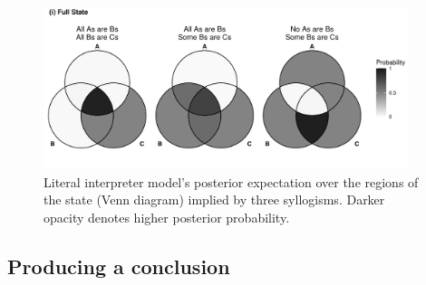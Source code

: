 \documentclass[floatsintext, doc]{apa6}
\begin{document}
%    


\begin{figure}[b]
    \centering
        \includegraphics[width = 0.95\textwidth]{figs/venn_literal_AA1_AI1_EI1_exp.pdf}
    \caption{ Literal interpreter model's posterior expectation over the regions of the state (Venn diagram) implied by three syllogisms. Darker opacity denotes higher posterior probability.}
    \label{fig:lit_state_qud}
\end{figure}







\subsection{Producing a conclusion}
\end{document}
